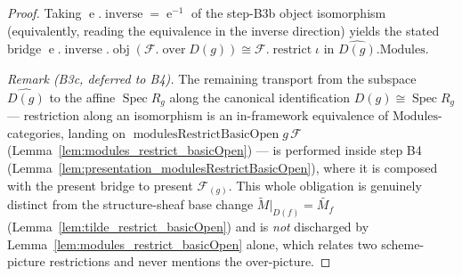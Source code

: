 \begin{proof}
  Taking \(\operatorname{e}.\operatorname{inverse} = \operatorname{e}^{-1}\) of the step-B3b object
  isomorphism (equivalently, reading the equivalence in the inverse direction) yields the stated bridge
  \(\operatorname{e}.\operatorname{inverse}.\operatorname{obj}(\mathcal{F}.\operatorname{over} D(g))
  \cong \mathcal{F}.\operatorname{restrict} \iota\) in \(\widehat{D(g)}.\mathrm{Modules}\).

  \emph{Remark (B3c, deferred to B4).} The remaining transport from the subspace \(\widehat{D(g)}\) to
  the affine \(\operatorname{Spec} R_g\) along the canonical identification \(D(g) \cong \operatorname{Spec} R_g\)
  — restriction along an isomorphism is an in-framework equivalence of \(\mathrm{Modules}\)-categories,
  landing on \(\operatorname{modulesRestrictBasicOpen} g\, \mathcal{F}\)
  (Lemma~\ref{lem:modules_restrict_basicOpen}) — is performed inside step B4
  (Lemma~\ref{lem:presentation_modulesRestrictBasicOpen}), where it is composed with the present bridge
  to present \(\mathcal{F}_{(g)}\). This whole obligation is genuinely distinct from the structure-sheaf
  base change \(\widetilde{M}|_{D(f)} = \widetilde{M_f}\) (Lemma~\ref{lem:tilde_restrict_basicOpen}) and
  is \emph{not} discharged by Lemma~\ref{lem:modules_restrict_basicOpen} alone, which relates two
  scheme-picture restrictions and never mentions the over-picture.
\end{proof}

